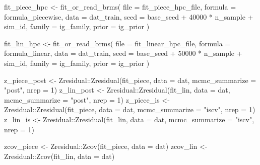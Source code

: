 \documentclass[
  english,
  letterpaper,
  DIV=11,
  numbers=noendperiod]{scrartcl}
\newenvironment{Shaded}{\begin{snugshade}}{\end{snugshade}}
\newcommand{\AttributeTok}[1]{\textcolor[rgb]{0.40,0.45,0.13}{#1}}
\newcommand{\DecValTok}[1]{\textcolor[rgb]{0.68,0.00,0.00}{#1}}
\newcommand{\FunctionTok}[1]{\textcolor[rgb]{0.28,0.35,0.67}{#1}}
\newcommand{\NormalTok}[1]{\textcolor[rgb]{0.00,0.23,0.31}{#1}}
\newcommand{\OtherTok}[1]{\textcolor[rgb]{0.00,0.23,0.31}{#1}}
\newcommand{\SpecialCharTok}[1]{\textcolor[rgb]{0.37,0.37,0.37}{#1}}
\newcommand{\StringTok}[1]{\textcolor[rgb]{0.13,0.47,0.30}{#1}}
\begin{document}
\begin{Shaded}
\begin{Highlighting}[]
\NormalTok{  fit\_piece\_hpc }\OtherTok{\textless{}{-}} \FunctionTok{fit\_or\_read\_brms}\NormalTok{(}
    \AttributeTok{file =}\NormalTok{ fit\_piece\_hpc\_file,}
    \AttributeTok{formula =}\NormalTok{ formula\_piecewise,}
    \AttributeTok{data =}\NormalTok{ dat\_train,}
    \AttributeTok{seed =}\NormalTok{ base\_seed }\SpecialCharTok{+} \DecValTok{40000} \SpecialCharTok{*}\NormalTok{ n\_sample }\SpecialCharTok{+}\NormalTok{ sim\_id,}
    \AttributeTok{family =}\NormalTok{ ig\_family,}
    \AttributeTok{prior =}\NormalTok{ ig\_prior}
\NormalTok{  )}

\NormalTok{  fit\_lin\_hpc }\OtherTok{\textless{}{-}} \FunctionTok{fit\_or\_read\_brms}\NormalTok{(}
    \AttributeTok{file =}\NormalTok{ fit\_linear\_hpc\_file,}
    \AttributeTok{formula =}\NormalTok{ formula\_linear,}
    \AttributeTok{data =}\NormalTok{ dat\_train,}
    \AttributeTok{seed =}\NormalTok{ base\_seed }\SpecialCharTok{+} \DecValTok{50000} \SpecialCharTok{*}\NormalTok{ n\_sample }\SpecialCharTok{+}\NormalTok{ sim\_id,}
    \AttributeTok{family =}\NormalTok{ ig\_family,}
    \AttributeTok{prior =}\NormalTok{ ig\_prior}
\NormalTok{  )}

\NormalTok{  z\_piece\_post }\OtherTok{\textless{}{-}}\NormalTok{ Zresidual}\SpecialCharTok{::}\FunctionTok{Zresidual}\NormalTok{(fit\_piece, }\AttributeTok{data =}\NormalTok{ dat, }\AttributeTok{mcmc\_summarize =} \StringTok{"post"}\NormalTok{, }\AttributeTok{nrep =} \DecValTok{1}\NormalTok{)}
\NormalTok{  z\_lin\_post   }\OtherTok{\textless{}{-}}\NormalTok{ Zresidual}\SpecialCharTok{::}\FunctionTok{Zresidual}\NormalTok{(fit\_lin,   }\AttributeTok{data =}\NormalTok{ dat, }\AttributeTok{mcmc\_summarize =} \StringTok{"post"}\NormalTok{, }\AttributeTok{nrep =} \DecValTok{1}\NormalTok{)}
\NormalTok{  z\_piece\_is   }\OtherTok{\textless{}{-}}\NormalTok{ Zresidual}\SpecialCharTok{::}\FunctionTok{Zresidual}\NormalTok{(fit\_piece, }\AttributeTok{data =}\NormalTok{ dat, }\AttributeTok{mcmc\_summarize =} \StringTok{"iscv"}\NormalTok{, }\AttributeTok{nrep =} \DecValTok{1}\NormalTok{)}
\NormalTok{  z\_lin\_is     }\OtherTok{\textless{}{-}}\NormalTok{ Zresidual}\SpecialCharTok{::}\FunctionTok{Zresidual}\NormalTok{(fit\_lin,   }\AttributeTok{data =}\NormalTok{ dat, }\AttributeTok{mcmc\_summarize =} \StringTok{"iscv"}\NormalTok{, }\AttributeTok{nrep =} \DecValTok{1}\NormalTok{)}

\NormalTok{  zcov\_piece }\OtherTok{\textless{}{-}}\NormalTok{ Zresidual}\SpecialCharTok{::}\FunctionTok{Zcov}\NormalTok{(fit\_piece, }\AttributeTok{data =}\NormalTok{ dat)}
\NormalTok{  zcov\_lin   }\OtherTok{\textless{}{-}}\NormalTok{ Zresidual}\SpecialCharTok{::}\FunctionTok{Zcov}\NormalTok{(fit\_lin,   }\AttributeTok{data =}\NormalTok{ dat)}


\end{Highlighting}
\end{Shaded}
\end{document}
